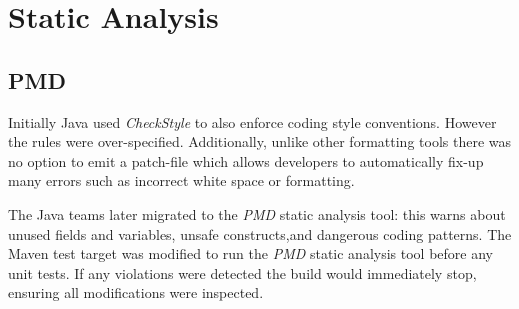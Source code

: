 \section{Static Analysis}
\subsection{PMD}
\par
Initially Java used \textit{CheckStyle} to also enforce coding style conventions. However the rules were over-specified. Additionally, unlike other formatting tools there was no option to emit a patch-file which allows developers to automatically fix-up many errors such as incorrect white space or formatting.

\par
The Java teams later migrated to the \textit{PMD}\cite{PMD} static analysis tool: this warns about unused fields and variables, unsafe constructs,and dangerous coding patterns.
The Maven test target was modified to run the \textit{PMD}\cite{PMD} static analysis tool before any unit tests. If any violations were detected the build would immediately stop, ensuring all modifications were inspected.